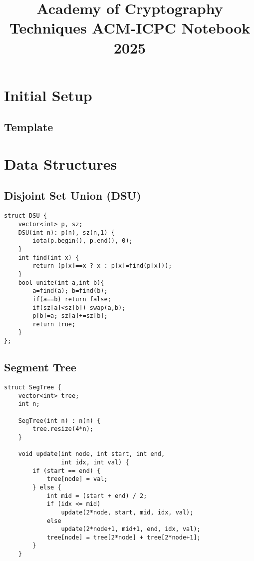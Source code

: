\documentclass[10pt]{article}
\title{\vspace{-4ex}\Large{Academy of Cryptography Techniques ACM-ICPC Notebook 2025}}
\author{}
\date{}
\begin{document}
\begin{landscape}
\begin{multicols}{2}

\maketitle
\vspace{-13ex}
\tableofcontents
\pagestyle{fancy}

\section{Initial Setup}
\subsection{Template}


\section{Data Structures}
\subsection{Disjoint Set Union (DSU)}
\begin{lstlisting}[style=cpp]
struct DSU {
    vector<int> p, sz;
    DSU(int n): p(n), sz(n,1) {
        iota(p.begin(), p.end(), 0);
    }
    int find(int x) {
        return (p[x]==x ? x : p[x]=find(p[x]));
    }
    bool unite(int a,int b){
        a=find(a); b=find(b);
        if(a==b) return false;
        if(sz[a]<sz[b]) swap(a,b);
        p[b]=a; sz[a]+=sz[b];
        return true;
    }
};
\end{lstlisting}

\subsection{Segment Tree}
\begin{lstlisting}[style=cpp]
struct SegTree {
    vector<int> tree;
    int n;
    
    SegTree(int n) : n(n) {
        tree.resize(4*n);
    }
    
    void update(int node, int start, int end, 
                int idx, int val) {
        if (start == end) {
            tree[node] = val;
        } else {
            int mid = (start + end) / 2;
            if (idx <= mid)
                update(2*node, start, mid, idx, val);
            else
                update(2*node+1, mid+1, end, idx, val);
            tree[node] = tree[2*node] + tree[2*node+1];
        }
    }
    

\end{lstlisting}
\end{multicols}
\end{landscape}
\end{document}
